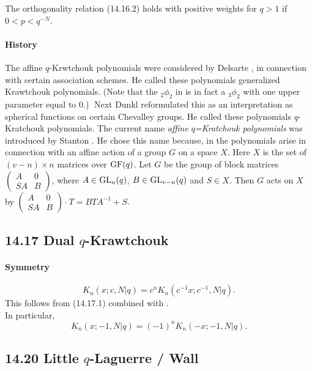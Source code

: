 \documentclass[twoside,11pt]{article}
\newcommand\sa{\smallskipamount}
\newcommand\sLP{\\[\sa]}
\begin{document}
The orthogonality relation (14.16.2) holds with positive weights for $q>1$
if $0<p<q^{-N}$.
%
\paragraph{History}
The affine $q$-Krwtchouk polynomials were considered by Delsarte , \cite[(16)]{K23}
in connection with certain association schemes.
He called these polynomials generalized Krawtchouk polynomials.
(Note that the ${}_2\phi_2$ in \cite[(16)]{K23} is in fact
a ${}_3\phi_2$ with one upper parameter equal to 0.)$\;$
Next Dunkl 
reformulated this as an interpretation as spherical functions
on certain Chevalley groups. He called these polynomials
$q$-Kratchouk polynomials. The current name
{\em affine $q$=Kratchouk polynomials} was introduced by
Stanton . He chose this name because,
in  the polynomials arise in connection
with an affine action of a group $G$ on a space $X$. Here
$X$ is the set of $(v-n)\times n$ matrices over ${\rm GF}(q)$.
Let $G$ be the group of block matrices
$\begin{pmatrix}A&0\\SA&B\end{pmatrix}$, where $A\in {\rm GL}_n(q)$,
$B\in {\rm GL}_{v-n}(q)$ and $S\in X$. Then $G$ acts on $X$ by
$\begin{pmatrix}A&0\\SA&B\end{pmatrix}\cdot T=BTA^{-1}+S$.
%
\subsection*{14.17 Dual $q$-Krawtchouk}
\label{sec14.17}
%
\paragraph{Symmetry}
\begin{equation}
K_n(x;c,N |  q)=c^n K_n(c^{-1}x;c^{-1},N |  q).
\label{87}
\end{equation}
This follows from (14.17.1) combined with .
\sLP
In particular,
\begin{equation}
K_n(x;-1,N |  q)=(-1)^n K_n(-x;-1,N |  q).
\label{88}
\end{equation}
%
\subsection*{14.20 Little $q$-Laguerre / Wall}
\label{sec14.20}
%
\end{document}
